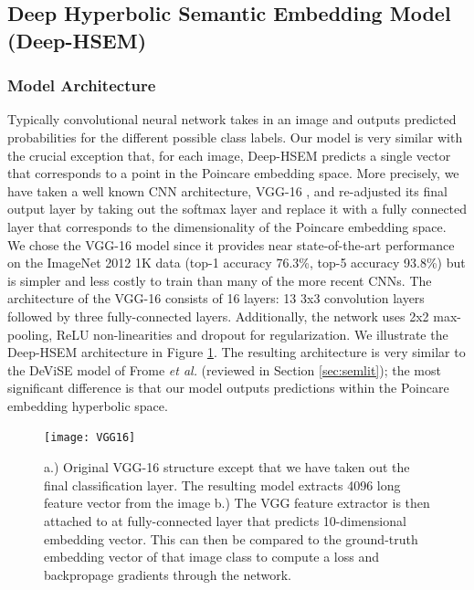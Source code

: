 \documentclass[12pt]{report}
\begin{document}
\subsection{Deep Hyperbolic Semantic Embedding Model \\ (Deep-HSEM)}
\subsubsection{Model Architecture}
Typically convolutional neural network takes in an image and outputs predicted probabilities for the different possible class labels. Our model is very similar with the crucial exception that, for each image, Deep-HSEM predicts a single vector that corresponds to a point in the Poincare embedding space. More precisely, we have taken a well known CNN architecture, VGG-16 \cite{Simonyan2014}, and re-adjusted its final output layer by taking out the softmax layer and replace it with a fully connected layer that corresponds to the dimensionality of the Poincare embedding space. We chose the VGG-16
model since it provides near state-of-the-art performance on the ImageNet 2012 1K data (top-1 accuracy 76.3\%, top-5 accuracy 93.8\%) but is simpler and less costly to train than many of the more recent CNNs. The architecture of the VGG-16 consists of 16 layers: 13 3x3 convolution layers followed by three fully-connected layers. Additionally, the network uses 2x2 max-pooling, ReLU non-linearities and dropout for regularization. We illustrate the Deep-HSEM architecture in Figure \ref{fig:dhsem}. The resulting architecture is very similar to the DeViSE model of Frome \textit{et al.} \cite{Frome2013} (reviewed in Section \ref{sec:semlit}); the most significant difference is that our model outputs predictions within the Poincare embedding hyperbolic space. 

\begin{figure}
  \centering
  \texttt{[image: VGG16]}
  \caption{a.) Original VGG-16 structure except that we have taken out the final classification layer. The resulting model extracts 4096 long feature vector from the image b.) The VGG feature extractor is then attached to at fully-connected layer that predicts 10-dimensional embedding vector. This can then be compared to the ground-truth embedding vector of that image class to compute a loss and backpropage gradients through the network.}
  \label{fig:dhsem}
\end{figure}
\end{document}
